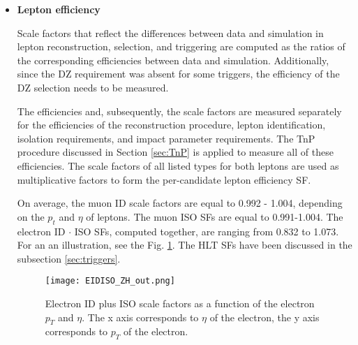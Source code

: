 \begin{itemize}

\item{\bfseries Lepton efficiency} 

Scale factors that reflect the differences between data and simulation in lepton 
reconstruction, selection, and triggering are computed as the ratios of the corresponding
efficiencies between data and simulation. Additionally, since the DZ requirement was absent for some triggers, the efficiency of the DZ selection needs to be measured. 

The efficiencies and, subsequently, the scale factors are measured separately for the efficiencies of the reconstruction procedure, lepton identification, isolation requirements, and impact parameter requirements. The TnP procedure discussed in Section \ref{sec:TnP} is applied to measure all of these efficiencies. The scale factors of all listed types for both leptons are used as multiplicative factors
to form the per-candidate lepton efficiency SF.

On average, the muon ID scale factors are equal to 0.992 - 1.004, depending on the $p_t$ and $\eta$ of leptons. The muon ISO SFs are equal to 0.991-1.004. The electron ID $\cdot$ ISO SFs, computed together, are ranging from 0.832 to 1.073. For an an illustration, see the Fig. \ref{fig:eleIDnISO_SF}. The HLT SFs have been discussed in the subsection \ref{sec:triggers}. 



%
%

\begin{figure}[H]
\centering
\texttt{[image: EIDISO\_ZH\_out.png]}
\caption[Electron ID plus ISO scale factors.]{ Electron ID plus ISO scale factors as a function of the electron $p_{T}$ and $\eta$. The x axis corresponds to $\eta$ of the electron, the y axis corresponds to $p_T$ of the electron.}
\label{fig:eleIDnISO_SF}
\end{figure}





\end{itemize}
